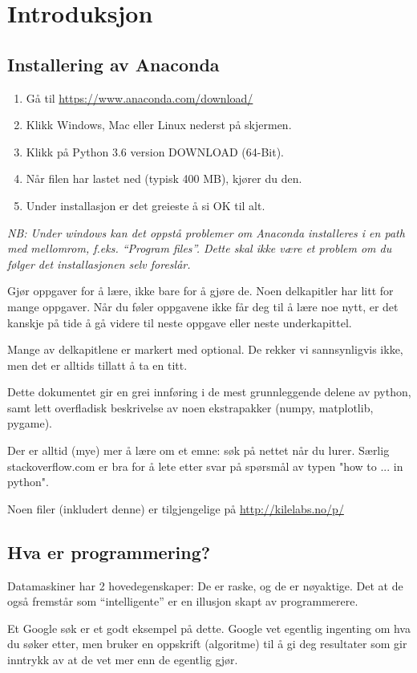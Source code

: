 \chapter{Introduksjon}
\section{Installering av Anaconda}
\begin{enumerate}
\item Gå til \url{https://www.anaconda.com/download/}
\item Klikk Windows, Mac eller Linux nederst på skjermen.
\item Klikk på Python 3.6 version  DOWNLOAD  (64-Bit).
\item Når filen har lastet ned (typisk 400 MB), kjører du den.
\item Under installasjon er det greieste å si OK til alt.
\end{enumerate}
{\em NB: Under windows kan det oppstå problemer om Anaconda installeres i en path med mellomrom, f.eks. \emph{``Program files''}. Dette skal ikke være et problem om du følger det installasjonen selv foreslår.}

Gjør oppgaver for å lære, ikke bare for å gjøre de. Noen delkapitler har litt for mange oppgaver. Når du føler oppgavene ikke får deg til å lære noe nytt, er det kanskje på tide å gå videre til neste oppgave eller neste underkapittel. 

Mange av delkapitlene er markert med optional. De rekker vi sannsynligvis ikke, men det er alltids tillatt å ta en titt. 

Dette dokumentet gir en grei innføring i de mest grunnleggende delene av python,  samt lett overfladisk beskrivelse av noen ekstrapakker (numpy, matplotlib, pygame). 

Der er alltid (mye) mer å lære om et emne: søk på nettet når du lurer. Særlig stackoverflow.com er bra for å lete etter svar på spørsmål av typen "how to ... in python". 

Noen filer (inkludert denne) er tilgjengelige på \url{http://kilelabs.no/p/}

\section{Hva er programmering?}
Datamaskiner har 2 hovedegenskaper: De er raske, og de er nøyaktige. Det at de også fremstår som ``intelligente'' er en illusjon skapt av programmerere.

Et Google søk er et godt eksempel på dette. Google vet egentlig ingenting om hva du søker etter, men bruker en oppskrift (algoritme) til å gi deg resultater som gir inntrykk av at de vet mer enn de egentlig gjør.

